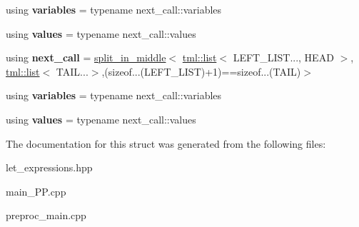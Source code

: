 \begin{DoxyCompactItemize}
\item 
\hypertarget{structtml_1_1impl_1_1multi__let__currifier_1_1split__in__middle_3_01tml_1_1list_3_01LEFT__LIST_843785e5577dc8253b5980b3ba33c2080_af4542800cc14b351ace98018ee6a8ec3}{using {\bfseries variables} = typename next\+\_\+call\+::variables}\label{structtml_1_1impl_1_1multi__let__currifier_1_1split__in__middle_3_01tml_1_1list_3_01LEFT__LIST_843785e5577dc8253b5980b3ba33c2080_af4542800cc14b351ace98018ee6a8ec3}

\item 
\hypertarget{structtml_1_1impl_1_1multi__let__currifier_1_1split__in__middle_3_01tml_1_1list_3_01LEFT__LIST_843785e5577dc8253b5980b3ba33c2080_a79ad0840b1fbbfc0c5ccc51c194bbe26}{using {\bfseries values} = typename next\+\_\+call\+::values}\label{structtml_1_1impl_1_1multi__let__currifier_1_1split__in__middle_3_01tml_1_1list_3_01LEFT__LIST_843785e5577dc8253b5980b3ba33c2080_a79ad0840b1fbbfc0c5ccc51c194bbe26}

\item 
\hypertarget{structtml_1_1impl_1_1multi__let__currifier_1_1split__in__middle_3_01tml_1_1list_3_01LEFT__LIST_843785e5577dc8253b5980b3ba33c2080_a2d3bfa17e2d66444ad6328e24a3b2433}{using {\bfseries next\+\_\+call} = \hyperlink{structtml_1_1impl_1_1multi__let__currifier_1_1split__in__middle}{split\+\_\+in\+\_\+middle}$<$ \hyperlink{structtml_1_1list}{tml\+::list}$<$ L\+E\+F\+T\+\_\+\+L\+I\+S\+T..., H\+E\+A\+D $>$, \hyperlink{structtml_1_1list}{tml\+::list}$<$ T\+A\+I\+L...$>$,(sizeof...(L\+E\+F\+T\+\_\+\+L\+I\+S\+T)+1)==sizeof...(T\+A\+I\+L)$>$}\label{structtml_1_1impl_1_1multi__let__currifier_1_1split__in__middle_3_01tml_1_1list_3_01LEFT__LIST_843785e5577dc8253b5980b3ba33c2080_a2d3bfa17e2d66444ad6328e24a3b2433}

\item 
\hypertarget{structtml_1_1impl_1_1multi__let__currifier_1_1split__in__middle_3_01tml_1_1list_3_01LEFT__LIST_843785e5577dc8253b5980b3ba33c2080_af4542800cc14b351ace98018ee6a8ec3}{using {\bfseries variables} = typename next\+\_\+call\+::variables}\label{structtml_1_1impl_1_1multi__let__currifier_1_1split__in__middle_3_01tml_1_1list_3_01LEFT__LIST_843785e5577dc8253b5980b3ba33c2080_af4542800cc14b351ace98018ee6a8ec3}

\item 
\hypertarget{structtml_1_1impl_1_1multi__let__currifier_1_1split__in__middle_3_01tml_1_1list_3_01LEFT__LIST_843785e5577dc8253b5980b3ba33c2080_a79ad0840b1fbbfc0c5ccc51c194bbe26}{using {\bfseries values} = typename next\+\_\+call\+::values}\label{structtml_1_1impl_1_1multi__let__currifier_1_1split__in__middle_3_01tml_1_1list_3_01LEFT__LIST_843785e5577dc8253b5980b3ba33c2080_a79ad0840b1fbbfc0c5ccc51c194bbe26}

\end{DoxyCompactItemize}


The documentation for this struct was generated from the following files\+:\begin{DoxyCompactItemize}
\item 
let\+\_\+expressions.\+hpp\item 
main\+\_\+\+P\+P.\+cpp\item 
preproc\+\_\+main.\+cpp\end{DoxyCompactItemize}
